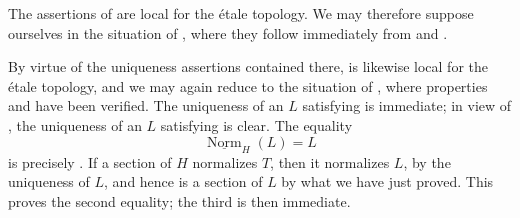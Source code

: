 The assertions of \textup{} are local for the étale topology.
We may therefore suppose ourselves in the situation of ,
where they follow immediately from \textup{} and \textup{}.

By virtue of the uniqueness assertions contained there,
\textup{} is likewise local for the étale topology, and we may
again reduce to the situation of , where properties
\textup{} and \textup{} have been verified. The uniqueness of
an \(L\) satisfying \textup{} is immediate; in view of
\textup{}, the uniqueness of an \(L\) satisfying \textup{}
is clear. The equality
\[
  \underline{\operatorname{Norm}}_H(L)=L
\]
is precisely . If a section of \(H\) normalizes \(T\),
then it normalizes \(L\), by the uniqueness of \(L\), and hence is
a section of \(L\) by what we have just proved. This proves the
second equality; the third is then immediate.

